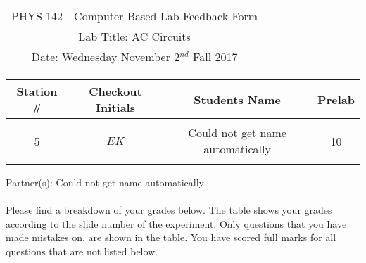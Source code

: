 \documentclass{article}
\begin{document}

\clearpage\begin{table}[h]
	\centering
	\begin{tabular}{c}
	PHYS 142 - Computer Based Lab Feedback Form\\
	Lab Title: AC Circuits\\Date: Wednesday November 2$^{nd}$ Fall 2017 \\\hline
\end{tabular}
\end{table}
\begin{table}[h]\centering \begin{tabular}{|c|c|p{9.9 cm}|c|}\hline Station \#  & Checkout Initials & \multicolumn{1}{|c|}{Students Name} & Prelab \\\hline\multirow{3}{*}{5}& \multirow{3}{*}{$EK$} & &\\& &\multicolumn{1}{|c|}{Could not get name automatically}&10\\&   &  &\\\hline
\end{tabular}
\end{table}
Partner(s): Could not get name automatically\\
\\Please find a breakdown of your grades below. The table shows your grades according to the slide number of the experiment. Only questions that you have made mistakes on, are shown in the table. You have scored full marks for all questions that are not listed below.
\end{document}
